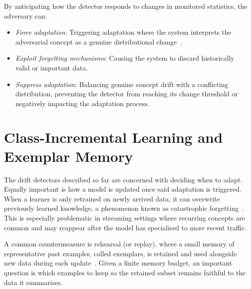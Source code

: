By anticipating how the detector responds to changes in monitored statistics, the adversary can:
\begin{itemize}
    \item \textit{Force adaptation}: Triggering adaptation where the system interprets the adversarial concept as a genuine distributional change~\cite{Korycki_2022}.
    \item \textit{Exploit forgetting mechanisms}: Causing the system to discard historically valid or important data.
    \item \textit{Suppress adaptation}: Balancing genuine concept drift with a conflicting distribution, preventing the detector from reaching its change threshold or negatively impacting the adaptation process.
\end{itemize}



\section{Class-Incremental Learning and Exemplar Memory}
\label{sec:exemplar memory}
The drift detectors described so far are concerned with deciding when to adapt. Equally important is how a model is updated once said adaptation is triggered. When a learner is only retrained on newly arrived data, it can overwrite previously learned knowledge, a phenomenon known as catastrophic forgetting~\cite{French_1999}. This is especially problematic in streaming settings where recurring concepts are common and may reappear after the model has specialised to more recent traffic.

A common countermeasure is rehearsal (or replay), where a small memory of representative past examples, called exemplars, is retained and used alongside new data during each update~\cite{Robins_1995}. Given a finite memory budget, an important question is which examples to keep so the retained subset remains faithful to the data it summarises.

